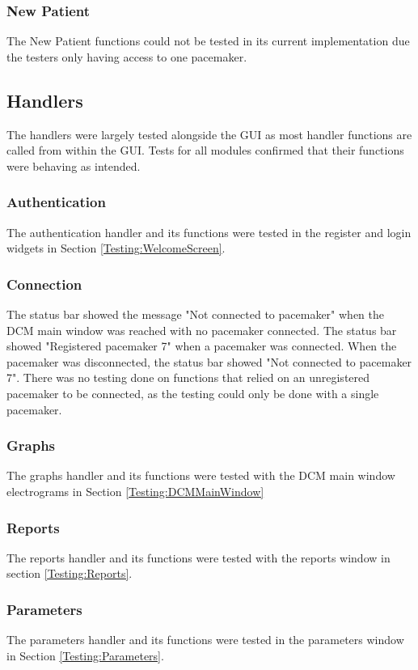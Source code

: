 \documentclass[12pt]{article}
\begin{document}
\subsubsection{New Patient}
The New Patient functions could not be tested in its current implementation due the testers only having access to one pacemaker.

\subsection{Handlers}
The handlers were largely tested alongside the GUI as most handler functions are called from within the GUI. Tests for all modules confirmed that their functions were behaving as intended.

\subsubsection{Authentication}
The authentication handler and its functions were tested in the register and login widgets in Section \ref{Testing:WelcomeScreen}.

\subsubsection{Connection}
The status bar showed the message "Not connected to pacemaker" when the DCM main window was reached with no pacemaker connected. The status bar showed "Registered pacemaker 7" when a pacemaker was connected. When the pacemaker was disconnected, the status bar showed "Not connected to pacemaker 7". There was no testing done on functions that relied on an unregistered pacemaker to be connected, as the testing could only be done with a single pacemaker.

\subsubsection{Graphs}
The graphs handler and its functions were tested with the DCM main window electrograms in Section \ref{Testing:DCMMainWindow}

\subsubsection{Reports}
The reports handler and its functions were tested with the reports window in section \ref{Testing:Reports}.

\subsubsection{Parameters}
The parameters handler and its functions were tested in the parameters window in Section \ref{Testing:Parameters}.
\end{document}
